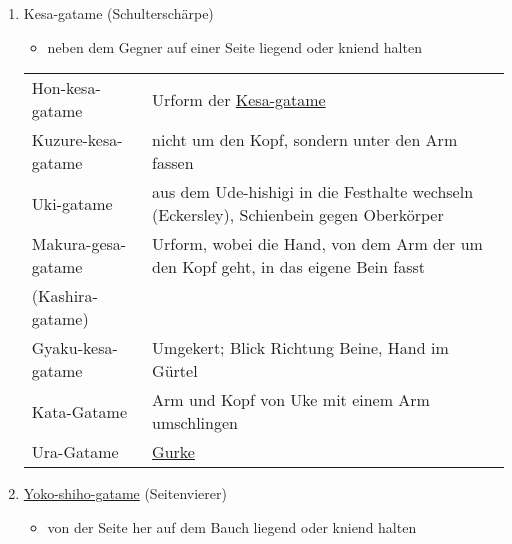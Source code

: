 \documentclass[justified, a4paper, notitlepage, captions=tableheading, nobib]{tufte-handout}
\begin{document}
\begin{enumerate}
\item \label{org5004057}Kesa-gatame (Schulterschärpe)
\label{sec:orge29b077}
\begin{itemize}
\item neben dem Gegner auf einer Seite liegend oder kniend halten
\end{itemize}

\begin{center}
\begin{tabular}{ll}
\label{org291fffc}Hon-kesa-gatame & Urform der \hyperref[org5004057]{Kesa-gatame}\\
\label{org5362391}Kuzure-kesa-gatame & nicht um den Kopf, sondern unter den Arm fassen\\
\label{orga060fd7}Uki-gatame & aus dem Ude-hishigi in die Festhalte wechseln (Eckersley), Schienbein gegen Oberkörper\\
\label{org82db592}Makura-gesa-gatame & Urform, wobei die Hand, von dem Arm der um den Kopf geht, in das eigene Bein fasst\\
(Kashira-gatame) & \\
\label{org11607e3}Gyaku-kesa-gatame & Umgekert; Blick Richtung Beine, Hand im Gürtel\\
\label{org86532d5}Kata-Gatame & Arm und Kopf von Uke mit einem Arm umschlingen\\
\label{org763a96e}Ura-Gatame & \hyperref[org297d645]{Gurke}\\
\end{tabular}
\end{center}

\item \hyperref[org5eab229]{Yoko-shiho-gatame} (Seitenvierer)
\label{sec:orgf7d7d2f}
\begin{itemize}
\item von der Seite her auf dem Bauch liegend oder kniend halten
\end{itemize}


\end{enumerate}
\end{document}
